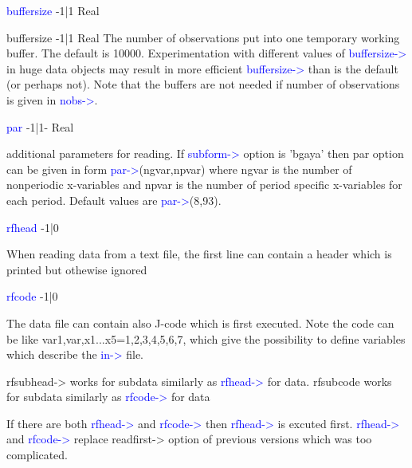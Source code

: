 \vspace{0.3cm}
\hline
\vspace{0.3cm}
\noindent \textcolor{blue}{buffersize} \tabto{3cm} -1|1 \tabto{5cm}  Real \tabto{7cm}
\begin{changemargin}{3cm}{0cm}
\noindent \noindent buffersize \tabto{3cm} -1|1 \tabto{5cm}  Real \tabto{7cm}
The number of observations put into one temporary working buffer. The default
is 10000. Experimentation with different values of \textcolor{blue}{buffersize->} in huge data
objects may result in more efficient \textcolor{blue}{buffersize->} than is the default (or perhaps
not). Note that the buffers are not needed if number of observations is given in
\textcolor{blue}{nobs->}.

\end{changemargin}
\vspace{0.3cm}
\hline
\vspace{0.3cm}
\noindent \textcolor{blue}{par} \tabto{3cm} -1|1- \tabto{5cm}   Real \tabto{7cm}
\begin{changemargin}{3cm}{0cm}
\noindent additional parameters for reading. If \textcolor{blue}{subform->} option is 'bgaya' then par
option can be given in form \textcolor{blue}{par->}(ngvar,npvar) where ngvar is the number
of nonperiodic x-variables and npvar is the number of period specific x-variables
for each period. Default values are \textcolor{blue}{par->}(8,93).

\end{changemargin}
\vspace{0.3cm}
\hline
\vspace{0.3cm}
\noindent \textcolor{blue}{rfhead}  \tabto{3cm} -1|0 \tabto{5cm}    \tabto{7cm}
\begin{changemargin}{3cm}{0cm}
\noindent  When reading data from a text file, the first line can contain a header which is
printed but othewise ignored

\end{changemargin}
\vspace{0.3cm}
\hline
\vspace{0.3cm}
\noindent \textcolor{blue}{rfcode}  \tabto{3cm} -1|0 \tabto{5cm}    \tabto{7cm}
\begin{changemargin}{3cm}{0cm}
\noindent The data file can contain also J-code which is first executed. Note the code can
be like var1,var,x1...x5=1,2,3,4,5,6,7, which give the possibility to
define variables which describe the \textcolor{blue}{in->} file.


rfsubhead-> works for subdata similarly as \textcolor{blue}{rfhead->} for data.
rfsubcode works for subdata similarly as \textcolor{blue}{rfcode->} for data

If there are both \textcolor{blue}{rfhead->} and \textcolor{blue}{rfcode->} then \textcolor{blue}{rfhead->} is excuted first.
\textcolor{blue}{rfhead->} and \textcolor{blue}{rfcode->} replace readfirst-> option  of previous versions which was too
complicated.
\end {changemargin}
\hline
\vspace{0.2cm}

